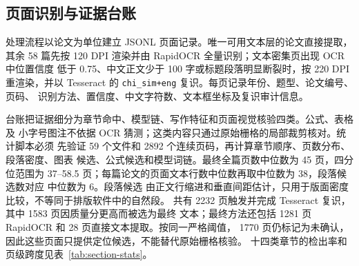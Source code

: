 \subsection{页面识别与证据台账}

处理流程以论文为单位建立 JSONL 页面记录。唯一可用文本层的论文直接提取，其余
58 篇先按 120 DPI 渲染并由 RapidOCR 全量识别；文本密集页出现 OCR 中位置信度
低于 0.75、中文正文少于 100 字或标题段落明显断裂时，按 220 DPI 重渲染，并以
Tesseract 的 \texttt{chi\_sim+eng} 复识。每页记录年份、题型、论文编号、页码、
识别方法、置信度、中文字符数、文本框坐标及复识审计信息。

台账把证据细分为章节命中、模型链、写作特征和页面视觉核验四类。公式、表格及
小字号图注不依据 OCR 猜测；这类内容只通过原始栅格的局部裁剪核对。统计脚本必须
先验证 59 个文件和 2892 个连续页码，再计算章节顺序、页数分布、段落密度、图表
候选、公式候选和模型词链。最终全篇页数中位数为 45 页，四分位范围为
37--58.5 页；每篇论文的页面文本行数中位数再取中位数为 38，段落候选数对应
中位数为 6。段落候选
由正文行缩进和垂直间距估计，只用于版面密度比较，不等同于排版软件中的自然段。
共有 2232 页触发并完成 Tesseract 复识，其中 1583 页因质量分更高而被选为最终
文本；最终方法还包括 1281 页 RapidOCR 和 28 页直接文本提取。按同一严格阈值，
1770 页仍标记为未确认，因此这些页面只提供定位候选，不能替代原始栅格核验。
十四类章节的检出率和页级跨度见表~\ref{tab:section-stats}。

